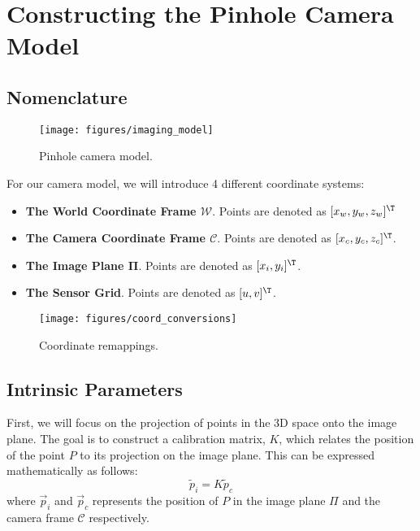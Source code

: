 \section{Constructing the Pinhole Camera Model}

\subsection{Nomenclature}
\begin{figure}[H]
    \centering
    \texttt{[image: figures/imaging\_model]}
    \caption{Pinhole camera model.}
\end{figure}

For our camera model, we will introduce 4 different coordinate systems:
\begin{itemize}[leftmargin=!, itemindent=-4ex]
    \item\textbf{The World Coordinate Frame $\boldsymbol{\mathcal{W}}$}. Points are denoted as $[x_w, y_w, z_w]^\T$
    \item\textbf{The Camera Coordinate Frame $\boldsymbol{\mathcal{C}}$}. Points are denoted as $[x_c, y_c, z_c]^\T$.
    \item\textbf{The Image Plane $\boldsymbol{\Pi}$}. Points are denoted as $[x_i, y_i]^\T$.
    \item\textbf{The Sensor Grid}. Points are denoted as $[u, v]^\T$.
\end{itemize}




\begin{figure}[H]
    \centering
    \texttt{[image: figures/coord\_conversions]}
    \caption{Coordinate remappings.}
\end{figure}


\subsection{Intrinsic Parameters} \label{sec:intrinsics}

First, we will focus on the projection of points in the 3D space onto the image plane. The goal is to construct a calibration matrix, $K$, which relates the position of the point $P$ to its projection on the image plane. This can be expressed mathematically as follows:
\begin{equation} \label{eq:pi}
    \widetilde{p}_i =  K\widetilde{p}_c
\end{equation}
where $\vec{p}_i$ and $\vec{p}_c$ represents the position of $P$ in the image plane $\Pi$ and the camera frame $\mathcal{C}$ respectively.

